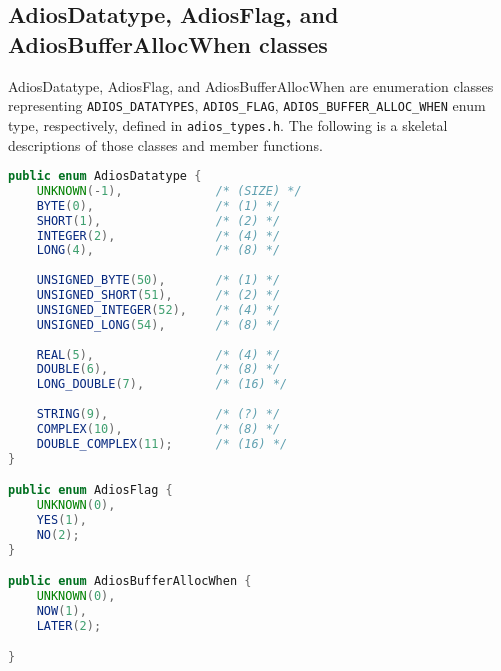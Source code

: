 \subsection{AdiosDatatype, AdiosFlag, and AdiosBufferAllocWhen classes}
AdiosDatatype, AdiosFlag, and AdiosBufferAllocWhen are enumeration classes representing \verb+ADIOS_DATATYPES+, \verb+ADIOS_FLAG+, \verb+ADIOS_BUFFER_ALLOC_WHEN+ enum type, respectively, defined in \verb+adios_types.h+. The following is a skeletal descriptions of those classes and member functions.
\begin{lstlisting}[language=Java,caption={Enum classes},label={}]
public enum AdiosDatatype {
    UNKNOWN(-1),             /* (SIZE) */
    BYTE(0),                 /* (1) */
    SHORT(1),                /* (2) */
    INTEGER(2),              /* (4) */
    LONG(4),                 /* (8) */
    
    UNSIGNED_BYTE(50),       /* (1) */
    UNSIGNED_SHORT(51),      /* (2) */
    UNSIGNED_INTEGER(52),    /* (4) */
    UNSIGNED_LONG(54),       /* (8) */
    
    REAL(5),                 /* (4) */
    DOUBLE(6),               /* (8) */
    LONG_DOUBLE(7),          /* (16) */
    
    STRING(9),               /* (?) */
    COMPLEX(10),             /* (8) */
    DOUBLE_COMPLEX(11);      /* (16) */
}

public enum AdiosFlag {
    UNKNOWN(0),
    YES(1), 
    NO(2);
}

public enum AdiosBufferAllocWhen {
    UNKNOWN(0),
    NOW(1), 
    LATER(2);

}
\end{lstlisting}


